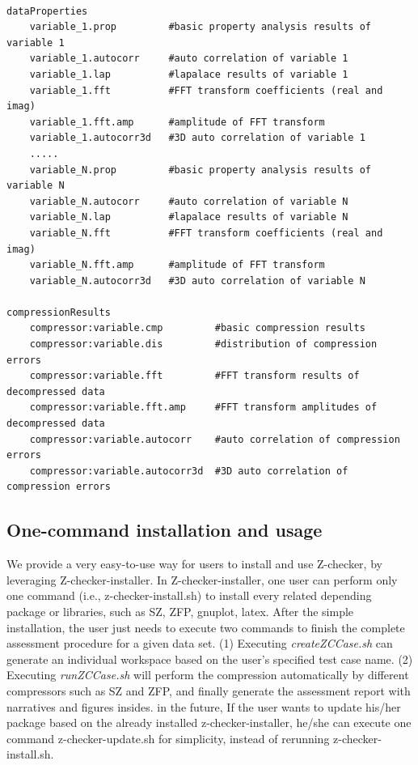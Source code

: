 \begin{lstlisting}[style=ShellStyleInline, basicstyle =\footnotesize\ttfamily]

dataProperties
    variable_1.prop         #basic property analysis results of variable 1
    variable_1.autocorr     #auto correlation of variable 1
    variable_1.lap          #lapalace results of variable 1
    variable_1.fft          #FFT transform coefficients (real and imag)
    variable_1.fft.amp      #amplitude of FFT transform
    variable_1.autocorr3d   #3D auto correlation of variable 1
    .....
    variable_N.prop         #basic property analysis results of variable N
    variable_N.autocorr     #auto correlation of variable N
    variable_N.lap          #lapalace results of variable N
    variable_N.fft          #FFT transform coefficients (real and imag)
    variable_N.fft.amp      #amplitude of FFT transform
    variable_N.autocorr3d   #3D auto correlation of variable N

compressionResults
    compressor:variable.cmp         #basic compression results
    compressor:variable.dis         #distribution of compression errors
    compressor:variable.fft         #FFT transform results of decompressed data
    compressor:variable.fft.amp     #FFT transform amplitudes of decompressed data
    compressor:variable.autocorr    #auto correlation of compression errors
    compressor:variable.autocorr3d  #3D auto correlation of compression errors
\end{lstlisting}

\subsection{One-command installation and usage}

We provide a very easy-to-use way for users to install and use Z-checker, by leveraging Z-checker-installer. In Z-checker-installer, one user can perform only one command (i.e., z-checker-install.sh) to install every related depending package or libraries, such as SZ, ZFP, gnuplot, latex. After the simple installation, the user just needs to execute two commands to finish the complete assessment procedure for a given data set. (1) Executing \emph{createZCCase.sh} can generate an individual workspace based on the user's specified test case name. (2) Executing \emph{runZCCase.sh} will perform the compression automatically by different compressors such as SZ and ZFP, and finally generate the assessment report with narratives and figures insides.
in the future, If the user wants to update his/her package based on the already installed z-checker-installer, he/she can execute one command z-checker-update.sh for simplicity, instead of rerunning z-checker-install.sh.

